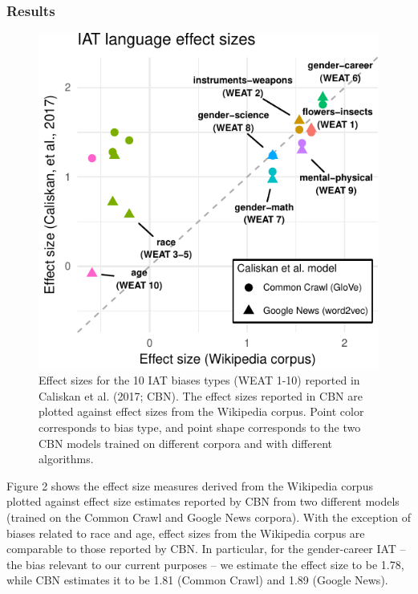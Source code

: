 \documentclass[10pt, letterpaper]{article}
\newenvironment{CodeChunk}{}{}
\begin{document}
\subsubsection{Results}\label{results-1}

\begin{CodeChunk}
\begin{figure}[t]

{\centering \includegraphics{figs/WEAT_plot-1} 

}

\caption[Effect sizes for the 10 IAT biases types (WEAT 1-10) reported in Caliskan et al]{Effect sizes for the 10 IAT biases types (WEAT 1-10) reported in Caliskan et al. (2017; CBN). The effect sizes reported in CBN are plotted against  effect sizes from the Wikipedia corpus.  Point color corresponds to  bias type, and point shape corresponds to the two CBN models trained on different corpora and with different algorithms.}\label{fig:WEAT_plot}
\end{figure}
\end{CodeChunk}

Figure 2 shows the effect size measures derived from the Wikipedia
corpus plotted against effect size estimates reported by CBN from two
different models (trained on the Common Crawl and Google News corpora).
With the exception of biases related to race and age, effect sizes from
the Wikipedia corpus are comparable to those reported by CBN. In
particular, for the gender-career IAT -- the bias relevant to our
current purposes -- we estimate the effect size to be 1.78, while CBN
estimates it to be 1.81 (Common Crawl) and 1.89 (Google News).
\end{document}

